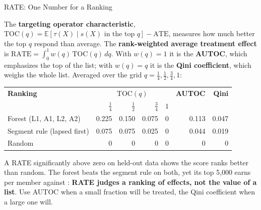 \documentclass[aspectratio=169, 11pt, handout]{beamer}
\newcommand{\E}{\mathbb{E}}
\newcommand{\ATE}{\text{ATE}}
\begin{document}
\begin{frame}{RATE: One Number for a Ranking}

The \textbf{targeting operator characteristic}, $\text{TOC}(q) = \E[\tau(X) \mid s(X) \text{ in the top } q] - \ATE$, measures how much better the top $q$ respond than average. The \textbf{rank-weighted average treatment effect} is $\text{RATE} = \int_0^1 w(q)\,\text{TOC}(q)\,dq$. With $w(q) = 1$ it is the \textbf{AUTOC}, which emphasizes the top of the list; with $w(q) = q$ it is the \textbf{Qini coefficient}, which weighs the whole list. Averaged over the grid $q = \tfrac14, \tfrac12, \tfrac34, 1$:

\begin{center}
\small
\begin{tabular}{lrrrrrr}
\toprule
\textbf{Ranking} & \multicolumn{4}{c}{$\text{TOC}(q)$} & \textbf{AUTOC} & \textbf{Qini} \\
& $\tfrac14$ & $\tfrac12$ & $\tfrac34$ & $1$ & & \\
\midrule
Forest (L1, A1, L2, A2) & 0.225 & 0.150 & 0.075 & 0 & 0.113 & 0.047 \\
Segment rule (lapsed first) & 0.075 & 0.075 & 0.025 & 0 & 0.044 & 0.019 \\
Random & 0 & 0 & 0 & 0 & 0 & 0 \\
\bottomrule
\end{tabular}
\end{center}

A RATE significantly above zero on held-out data shows the score ranks better than random. The forest beats the segment rule on both, yet its top 5{,}000 earns  per member against : \textbf{RATE judges a ranking of effects, not the value of a list}. Use AUTOC when a small fraction will be treated, the Qini coefficient when a large one will.
\end{frame}
\end{document}
